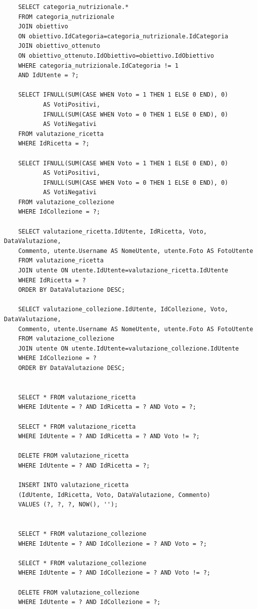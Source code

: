 ﻿\documentclass[a4paper,12pt]{report}
\begin{document}
\begin{verbatim}
    SELECT categoria_nutrizionale.*
    FROM categoria_nutrizionale
    JOIN obiettivo
    ON obiettivo.IdCategoria=categoria_nutrizionale.IdCategoria
    JOIN obiettivo_ottenuto
    ON obiettivo_ottenuto.IdObiettivo=obiettivo.IdObiettivo
    WHERE categoria_nutrizionale.IdCategoria != 1
    AND IdUtente = ?;
    
    SELECT IFNULL(SUM(CASE WHEN Voto = 1 THEN 1 ELSE 0 END), 0)
           AS VotiPositivi,
           IFNULL(SUM(CASE WHEN Voto = 0 THEN 1 ELSE 0 END), 0)
           AS VotiNegativi
    FROM valutazione_ricetta
    WHERE IdRicetta = ?;
    
    SELECT IFNULL(SUM(CASE WHEN Voto = 1 THEN 1 ELSE 0 END), 0)
           AS VotiPositivi,
           IFNULL(SUM(CASE WHEN Voto = 0 THEN 1 ELSE 0 END), 0)
           AS VotiNegativi
    FROM valutazione_collezione
    WHERE IdCollezione = ?;
    
    SELECT valutazione_ricetta.IdUtente, IdRicetta, Voto, DataValutazione,
    Commento, utente.Username AS NomeUtente, utente.Foto AS FotoUtente
    FROM valutazione_ricetta
    JOIN utente ON utente.IdUtente=valutazione_ricetta.IdUtente
    WHERE IdRicetta = ?
    ORDER BY DataValutazione DESC;
    
    SELECT valutazione_collezione.IdUtente, IdCollezione, Voto, DataValutazione, 
    Commento, utente.Username AS NomeUtente, utente.Foto AS FotoUtente
    FROM valutazione_collezione
    JOIN utente ON utente.IdUtente=valutazione_collezione.IdUtente
    WHERE IdCollezione = ?
    ORDER BY DataValutazione DESC;
    
    
    SELECT * FROM valutazione_ricetta
    WHERE IdUtente = ? AND IdRicetta = ? AND Voto = ?;
    
    SELECT * FROM valutazione_ricetta
    WHERE IdUtente = ? AND IdRicetta = ? AND Voto != ?;
    
    DELETE FROM valutazione_ricetta
    WHERE IdUtente = ? AND IdRicetta = ?;
    
    INSERT INTO valutazione_ricetta
    (IdUtente, IdRicetta, Voto, DataValutazione, Commento)
    VALUES (?, ?, ?, NOW(), '');
    
    
    SELECT * FROM valutazione_collezione
    WHERE IdUtente = ? AND IdCollezione = ? AND Voto = ?;
    
    SELECT * FROM valutazione_collezione
    WHERE IdUtente = ? AND IdCollezione = ? AND Voto != ?;
    
    DELETE FROM valutazione_collezione
    WHERE IdUtente = ? AND IdCollezione = ?;
    

\end{verbatim}
\end{document}

